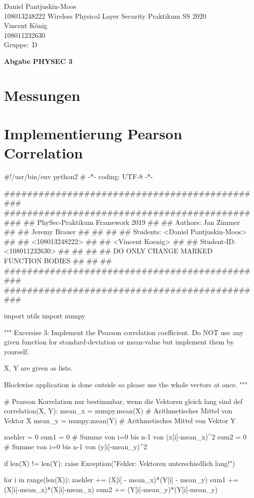 \documentclass[12pt,a4paper]{article}
\newcommand{\student}{Daniel Pantjuskin-Moos\\ 108013248222 } %
\newcommand{\partner}{Vincent König\\ 108011232630} %
\newcommand{\group}{D} %
\newcommand{\hwheadtwo}{$ $
  \vspace{-2cm}
  
\noindent \student \qquad \qquad  Wireless Physical Layer Security Praktikum \hfill SS 2020 \\
\noindent \partner \\
\noindent Gruppe:~\group\\
$ $

  
\begin{center}    
{\Large \bf Abgabe PHYSEC 3}
\end{center}
}
\begin{document}
\hwheadtwo

\section{Messungen}

\section{Implementierung Pearson Correlation}

\begin{python}
#!/usr/bin/env python2
# -*- coding: UTF-8 -*-

##############################################
##############################################
##   PhySec-Praktikum Framework 2019        ##
##   Authors: Jan Zimmer                    ##
##            Jeremy Brauer                 ##
##                                          ##
##   Students:   <Daniel Pantjuskin-Moos>   ##
##               <108013248222>             ##
##               <Vincent Koenig>           ##
##   Student-ID: <108011232630>             ##
##                                          ##
##   DO ONLY CHANGE MARKED FUNCTION BODIES  ##
##                                          ##
##############################################
##############################################


import utils
import numpy

"""
Excersise 3:
Implement the Pearson correlation coefficient.
Do NOT use any given function for standard-deviation or mean-value but implement them by yourself.

X, Y are given as lists.

Blockwise application is done outside so please use the whole vectors at once.
"""

# Pearson Korrelation nur bestimmbar, wenn die Vektoren gleich lang sind
def correlation(X, Y):
    mean_x = numpy.mean(X) # Arithmetisches Mittel von Vektor X
    mean_y = numpy.mean(Y) # Arithmetisches Mittel von Vektor Y

    zaehler = 0
    sum1 = 0 # Summe von i=0 bis n-1 von (x[i]-mean_x)^2
    sum2 = 0 # Summe von i=0 bis n-1 von (y[i]-mean_y)^2

    if len(X) != len(Y):
        raise Exception("Fehler: Vektoren unterschiedlich lang!\n")


    for i in range(len(X)):
        zaehler += (X[i] - mean_x)*(Y[i] - mean_y)
        sum1 += (X[i]-mean_x)*(X[i]-mean_x) 
        sum2 += (Y[i]-mean_y)*(Y[i]-mean_y) 


\end{python}
\end{document}
